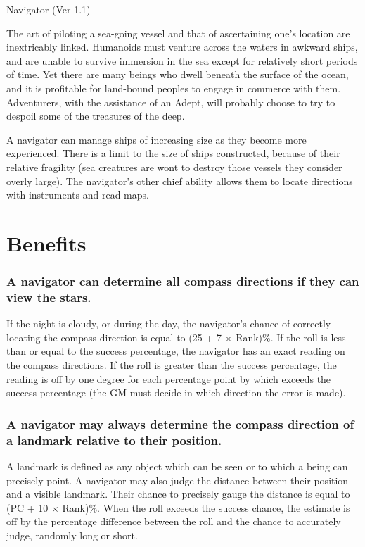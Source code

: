 \begin{Chapter}{Navigator (Ver 1.1)}

The art of piloting a sea-going vessel and that of ascertaining one’s
location are inextricably linked.  Humanoids must venture across the
waters in awkward ships, and are unable to survive immersion in the
sea except for relatively short periods of time. Yet there are many
beings who dwell beneath the surface of the ocean, and it is
profitable for land-bound peoples to engage in commerce with
them. Adventurers, with the assistance of an Adept, will probably
choose to try to despoil some of the treasures of the deep.

A navigator can manage ships of increasing size as they become more
experienced. There is a limit to the size of ships constructed,
because of their relative fragility (sea creatures are wont to destroy
those vessels they consider overly large).  The navigator’s other
chief ability allows them to locate directions with instruments and
read maps.

\section{Benefits}

\subsubsection{A navigator can determine all compass directions if they can view the stars.}

If the night is cloudy, or during the day, the navigator’s chance of
correctly locating the compass direction is equal to (25 + 7 ×
Rank)\%.  If the roll is less than or equal to the success percentage,
the navigator has an exact reading on the compass directions.  If the
roll is greater than the success percentage, the reading is off by one
degree for each percentage point by which exceeds the success
percentage (the GM must decide in which direction the error is made).

\subsubsection{A navigator may always determine the compass direction of a landmark
relative to their position.}

A landmark is defined as any object which can be seen or to which a
being can precisely point.  A navigator may also judge the distance
between their position and a visible landmark. Their chance to
precisely gauge the distance is equal to (PC + 10 × Rank)\%.  When the
roll exceeds the success chance, the estimate is off by the percentage
difference between the roll and the chance to accurately judge,
randomly long or short.


\end{Chapter}
